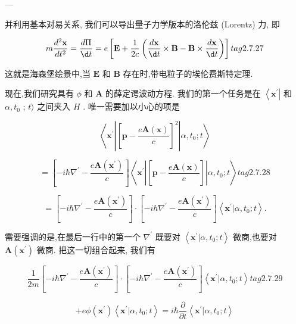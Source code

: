 \documentclass[lang=cn,newtx,10pt,scheme=chinese,thmcnt=section]{elegantbook}
\begin{document}
---

并利用基本对易关系, 我们可以导出量子力学版本的洛伦兹 (Lorentz) 力, 即

$$
m\frac{{d}^{2}\mathbf{x}}{d{t}^{2}} = \frac{d\Pi }{\d t} = e\left\lbrack {\mathbf{E} + \frac{1}{2c}\left( {\frac{d\mathbf{x}}{\d t} \times \mathbf{B} - \mathbf{B} \times \frac{d\mathbf{x}}{\d t}}\right) }\right\rbrack tag{2.7.27}
$$

这就是海森堡绘景中,当 $\mathbf{E}$ 和 $\mathbf{B}$ 存在时,带电粒子的埃伦费斯特定理.

现在,我们研究具有 $\phi$ 和 $\mathbf{A}$ 的薛定谔波动方程. 我们的第一个任务是在 $\left\langle {\mathbf{x}}^{\prime }\right|$ 和 $\alpha ,{t}_{0}$ ; $t\rangle$ 之间夹入 $H$ . 唯一需要加以小心的项是

$$
\left\langle {{\mathbf{x}}^{\prime }\left| {\left\lbrack \mathbf{p} - \frac{e\mathbf{A}\left( \mathbf{x}\right) }{c}\right\rbrack }^{2}\right| \alpha ,{t}_{0};t}\right\rangle
$$

$$
= \left\lbrack {-i\hbar {\nabla }^{\prime } - \frac{e\mathbf{A}\left( {\mathbf{x}}^{\prime }\right) }{c}}\right\rbrack \left\langle {{\mathbf{x}}^{\prime }\left| \left\lbrack {\mathbf{p} - \frac{e\mathbf{A}\left( \mathbf{x}\right) }{c}}\right\rbrack \right| \alpha ,{t}_{0};t}\right\rangle tag{2. 7.28}
$$

$$
= \left\lbrack {-i\hbar {\nabla }^{\prime } - \frac{e\mathbf{A}\left( {\mathbf{x}}^{\prime }\right) }{c}}\right\rbrack \cdot \left\lbrack {-{ih}{\nabla }^{\prime } - \frac{e\mathbf{A}\left( {\mathbf{x}}^{\prime }\right) }{c}}\right\rbrack \left\langle {{\mathbf{x}}^{\prime } | \alpha ,{t}_{0};t}\right\rangle .
$$

需要强调的是,在最后一行中的第一个 ${\nabla }^{\prime }$ 既要对 $\left\langle {{\mathbf{x}}^{\prime } | \alpha ,{t}_{0};t}\right\rangle$ 微商,也要对 $\mathbf{A}\left( {\mathbf{x}}^{\prime }\right)$ 微商. 把这一切组合起来, 我们有

$$
\frac{1}{2m}\left\lbrack {-i\hbar {\nabla }^{\prime } - \frac{e\mathbf{A}\left( {\mathbf{x}}^{\prime }\right) }{c}}\right\rbrack \cdot \left\lbrack {-i\hbar {\nabla }^{\prime } - \frac{e\mathbf{A}\left( {\mathbf{x}}^{\prime }\right) }{c}}\right\rbrack \left\langle {{\mathbf{x}}^{\prime } | \alpha ,{t}_{0};t}\right\rangle tag{2.7.29}
$$

$$
+ {e\phi }\left( {\mathbf{x}}^{\prime }\right) \left\langle {{\mathbf{x}}^{\prime } | \alpha ,{t}_{0};t}\right\rangle = i\hbar \frac{\partial }{\partial t}\left\langle {{\mathbf{x}}^{\prime } | \alpha ,{t}_{0};t}\right\rangle
$$
\end{document}
